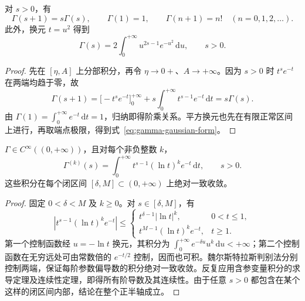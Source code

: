 \documentclass[UTF8,12pt,a4paper,fontset=fandol]{ctexbook}
\begin{document}
\begin{proposition}[递推公式与阶乘]
\label{prop:gamma-recurrence-factorials}
对 $s>0$，有
\begin{equation}
    \Gamma(s+1)=s\Gamma(s),\qquad
    \Gamma(1)=1,\qquad \Gamma(n+1)=n!\quad(n=0,1,2,\ldots).
    \label{eq:gamma-recurrence-factorials}
\end{equation}
此外，换元 $t=u^2$ 得到
\begin{equation}
    \Gamma(s)=2\int_0^{+\infty}u^{2s-1}e^{-u^2}\,\mathrm{d}u,
    \qquad s>0.
    \label{eq:gamma-gaussian-form}
\end{equation}
\end{proposition}

\begin{proof}
先在 $[\eta,A]$ 上分部积分，再令 $\eta\to0+$、$A\to+\infty$。因为 $s>0$ 时 $t^se^{-t}$ 在两端均趋于零，故
\[
    \Gamma(s+1)=\bigl[-t^se^{-t}\bigr]_0^{+\infty}
       +s\int_0^{+\infty}t^{s-1}e^{-t}\,\mathrm{d}t
    =s\Gamma(s).
\]
由 $\Gamma(1)=\int_0^{+\infty}e^{-t}\,\mathrm{d}t=1$，归纳即得阶乘关系。平方换元也先在有限正常区间上进行，再取端点极限，得到式~\eqref{eq:gamma-gaussian-form}。
\end{proof}

\begin{theorem}[光滑性与各阶导数]
\label{thm:gamma-smoothness-derivatives}
$\Gamma\in C^\infty((0,+\infty))$，且对每个非负整数 $k$，
\begin{equation}
    \Gamma^{(k)}(s)=\int_0^{+\infty}
       t^{s-1}(\ln t)^k e^{-t}\,\mathrm{d}t,\qquad s>0.
    \label{eq:gamma-derivative-integrals}
\end{equation}
这些积分在每个闭区间 $[\delta,M]\subset(0,+\infty)$ 上绝对一致收敛。
\end{theorem}

\begin{proof}
固定 $0<\delta<M$ 及 $k\geq0$。对 $s\in[\delta,M]$，有
\[
    |t^{s-1}(\ln t)^k e^{-t}|
    \leq\begin{cases}
        t^{\delta-1}|\ln t|^k,&0<t\leq1,\\
        t^{M-1}(\ln t)^k e^{-t},&t\geq1.
    \end{cases}
\]
第一个控制函数经 $u=-\ln t$ 换元，其积分为 $\int_0^{+\infty}e^{-\delta u}u^k\,\mathrm{d}u<+\infty$；第二个控制函数在无穷远处可由常数倍的 $e^{-t/2}$ 控制，因而也可积。魏尔斯特拉斯判别法分别控制两端，保证每阶参数偏导数的积分绝对一致收敛。反复应用含参变量积分的求导定理及连续性定理，即得所有阶导数及其连续性。由于任意 $s>0$ 都包含在某个这样的闭区间内部，结论在整个正半轴成立。
\end{proof}
\end{document}
